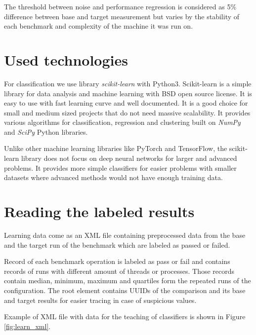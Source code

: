 The threshold between noise and performance regression is considered as 5\%
difference between base and target measurement but varies by the stability of
each benchmark and complexity of the machine it was run on.

\section{Used technologies}
For classification we use library \emph{scikit-learn}\;\cite{scikit-learn} with
Python3. Scikit-learn is a simple library for data analysis and machine learning
with BSD open source license. It is easy to use with fast learning curve and
well documented. It is a good choice for small and medium sized projects that do
not need massive scalability. It provides various algorithms for classification,
regression and clustering built on \emph{NumPy} and \emph{SciPy} Python
libraries.

Unlike other machine learning libraries like PyTorch and TensorFlow, the
scikit-learn library does not focus on deep neural networks for larger and
advanced problems. It provides more simple classifiers for easier problems
with smaller datasets where advanced methods would not have enough training
data.

\section{Reading the labeled results} \label{sec:learn_xml}
Learning data come as an XML file containing preprocessed data from
the base and the target run of the benchmark which are labeled as passed or failed.

Record of each benchmark operation is labeled as pass or fail and contains
records of runs with different amount of threads or processes. Those records
contain median, minimum, maximum and quartiles form the repeated runs of the
configuration. The root element contains UUIDs of the comparison and its base
and target results for easier tracing in case of suspicious values.

Example of XML file with data for the teaching of classifiers is shown in Figure
\ref{fig:learn_xml}.

